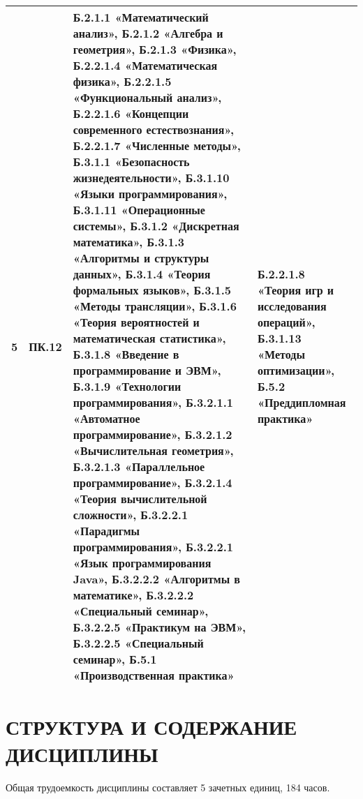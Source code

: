 \begin{longtable}{|c|p{}|p{}|p{}|}
5 & ПК.12 & Б.2.1.1 «Математический анализ», Б.2.1.2 «Алгебра и геометрия», Б.2.1.3 «Физика», Б.2.2.1.4 «Математическая физика», Б.2.2.1.5 «Функциональный анализ», Б.2.2.1.6 «Концепции современного естествознания», Б.2.2.1.7 «Численные методы», Б.3.1.1 «Безопасность жизнедеятельности», Б.3.1.10 «Языки программирования», Б.3.1.11 «Операционные системы», Б.3.1.2 «Дискретная математика», Б.3.1.3 «Алгоритмы и структуры данных», Б.3.1.4 «Теория формальных языков», Б.3.1.5 «Методы трансляции», Б.3.1.6 «Теория вероятностей и математическая статистика», Б.3.1.8 «Введение в программирование и ЭВМ», Б.3.1.9 «Технологии программирования», Б.3.2.1.1 «Автоматное программирование», Б.3.2.1.2 «Вычислительная геометрия», Б.3.2.1.3 «Параллельное программирование», Б.3.2.1.4 «Теория вычислительной сложности», Б.3.2.2.1 «Парадигмы программирования», Б.3.2.2.1 «Язык программирования Java», Б.3.2.2.2 «Алгоритмы в математике», Б.3.2.2.2 «Специальный семинар», Б.3.2.2.5 «Практикум на ЭВМ», Б.3.2.2.5 «Специальный семинар», Б.5.1 «Производственная практика» & Б.2.2.1.8 «Теория игр и исследования операций», Б.3.1.13 «Методы оптимизации», Б.5.2 «Преддипломная практика»\\\hline

\end{longtable}

\newpage
\section{СТРУКТУРА И СОДЕРЖАНИЕ ДИСЦИПЛИНЫ}
Общая трудоемкость дисциплины составляет 5 зачетных единиц, 184 часов.

